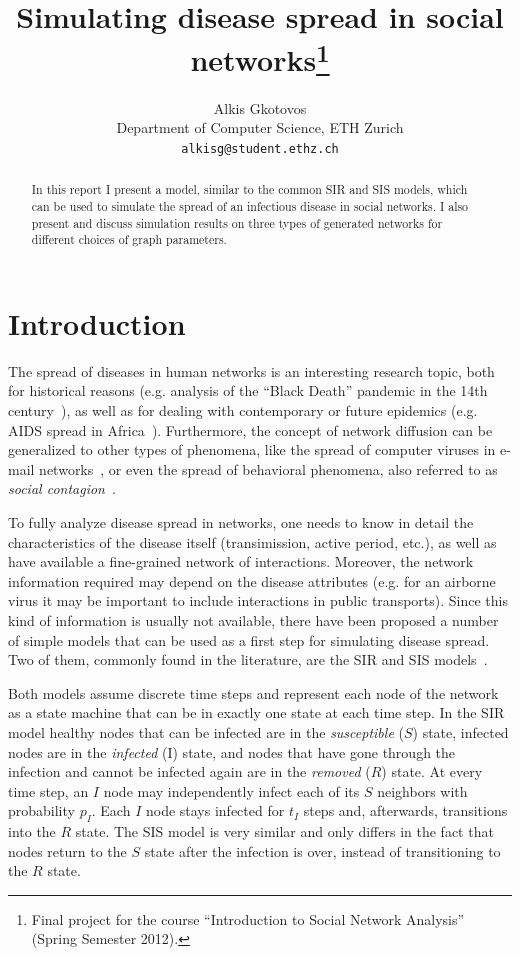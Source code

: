 \documentclass[11pt]{article} %
\title{Simulating disease spread in social networks\thanks{Final project
for the course ``Introduction to Social Network Analysis'' (Spring
Semester 2012).}}
\author{
Alkis Gkotovos\\
Department of Computer Science, ETH Zurich\\
\texttt{alkisg@student.ethz.ch}
}
\begin{document}
\maketitle

\begin{abstract}
In this report I present a model, similar to the common SIR and SIS models,
which can be used to simulate the spread of an infectious disease in
social networks. I also present and discuss simulation results on three
types of generated networks for different choices of graph parameters.
\end{abstract}

\section{Introduction}
The spread of diseases in human networks is an interesting research topic, both
for historical reasons (e.g. analysis of the ``Black Death'' pandemic in the
14th century~\cite{blackdeath}), as well as for dealing with contemporary or
future epidemics (e.g. AIDS spread in Africa~\cite{aids}). Furthermore, the
concept of network diffusion can be generalized to other types of phenomena,
like the spread of computer viruses in e-mail networks~\cite{email}, or even
the spread of behavioral phenomena, also referred to as
\emph{social contagion}~\cite{contagion}.

To fully analyze disease spread in networks, one needs to know in detail the
characteristics of the disease itself (transimission, active period, etc.),
as well as have available a fine-grained network of interactions. Moreover, the network
information required may depend on the disease attributes (e.g. for an airborne virus
it may be important to include interactions in public transports). Since this
kind of information is usually not available, there have been proposed a
number of simple models that can be used as a first step for simulating disease
spread. Two of them, commonly found in the literature, are the SIR and SIS
models~\cite{easley, newman}.

Both models assume discrete time steps and represent each node of the network
as a state machine that can be in exactly one state at each time step. In the
SIR model healthy nodes that can be infected are in the \emph{susceptible} ($S$)
state, infected nodes are in the \emph{infected} (I) state, and nodes that have
gone through the infection and cannot be infected again are in the \emph{removed}
($R$) state. At every time step, an $I$ node may independently infect each of
its $S$ neighbors with probability $p_I$. Each $I$ node stays infected for
$t_I$ steps and, afterwards, transitions into the $R$ state.
The SIS model is very similar and only differs in the fact that nodes return
to the $S$ state after the infection is over, instead of transitioning to the
$R$ state.
\end{document}
